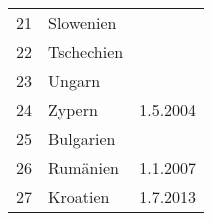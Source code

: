 \begin{table}[ht]
\begin{tabular}{m{5em}|m{15em}|m{10em}}
\cline{1-2}
\rowcolor{Gray}
21 &Slowenien  & \\
\cline{1-2}
\rowcolor{Gray}
22 &Tschechien  & \\
\cline{1-2}
\rowcolor{Gray}
23 &Ungarn  & \\
\cline{1-2}
\rowcolor{Gray}
24 &Zypern & \multirow{-10}{*}{1.5.2004}\\
\hline
\rowcolor{Gray}
25 &Bulgarien & \\
\cline{1-2}
\rowcolor{Gray}
26 &Rumänien & \multirow{-2}{*}{1.1.2007}\\
\hline
\rowcolor{Gray}
27 &Kroatien &1.7.2013 \\
\end{tabular}
\end{table}